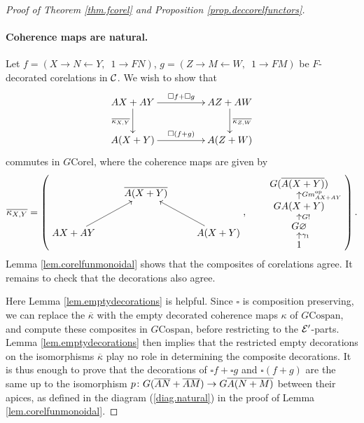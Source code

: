 \begin{proof}[Proof of Theorem \ref{thm.fcorel} and Proposition
  \ref{prop.deccorelfunctors}]
  \paragraph{Coherence maps are natural.}
  Let $f = (X \longrightarrow N \longleftarrow Y, \enspace 1 \to FN)$, $g= (Z
  \longrightarrow M \longleftarrow W, \enspace 1 \to FM)$ be $F$-decorated
  corelations in $\mathcal C$. We wish to show that
  \[
    \xymatrixcolsep{4pc}
    \xymatrixrowsep{2pc}
    \xymatrix{
      AX+AY \ar[r]^{\square f+\square g}
      \ar[d]_{\overline{\kappa_{X,Y}}} & 
      AZ+AW \ar[d]^{\overline{\kappa_{Z,W}}} \\
      A(X+Y) \ar[r]^{\square(f+g)} & A(Z+W)
    }
  \]
  commutes in $G\mathrm{Corel}$, where the coherence maps are given by
  \[
    \overline{\kappa_{X,Y}}=          
    \left(
    \begin{aligned}
      \xymatrix{
	& \overline{A(X+Y)} \\  
	AX+AY \ar[ur] && A(X+Y) \ar[ul]
      }
    \end{aligned}
    ,
    \qquad
    \begin{aligned}
      \xymatrixrowsep{1.4ex}
      \xymatrix{
	G(\overline{A(X+Y)}) \\
	GA(X+Y) \ar[u]_{Gm_{AX+AY}^\opp} \\
	G\varnothing \ar[u]_{G!} \\
	1 \ar[u]_{\gamma_1}
      }
    \end{aligned}
    \right).
  \]
  Lemma \ref{lem.corelfunmonoidal} shows that the composites of corelations
  agree. It remains to check that the decorations also agree.

  Here Lemma \ref{lem.emptydecorations} is helpful. Since $\square$ is
  composition preserving, we can replace the $\overline{\kappa}$ with the empty
  decorated coherence maps $\kappa$ of $G\mathrm{Cospan}$, and compute these
  composites in $G\mathrm{Cospan}$, before restricting to the $\mathcal E'$-parts.
  Lemma \ref{lem.emptydecorations} then implies that the restricted empty
  decorations on the isomorphisms $\overline{\kappa}$ play no role in
  determining the composite decorations. It is thus enough to prove that the
  decorations of $\square f + \square g$ and $\square(f+g)$ are the same up to
  the isomorphism $p{\colon} G(\overline{AN} +\overline{AM}) \to
  G\overline{A(N+M)}$ between their apices, as defined in the diagram
  (\ref{diag.natural}) in the proof of Lemma \ref{lem.corelfunmonoidal}.


\end{proof}
